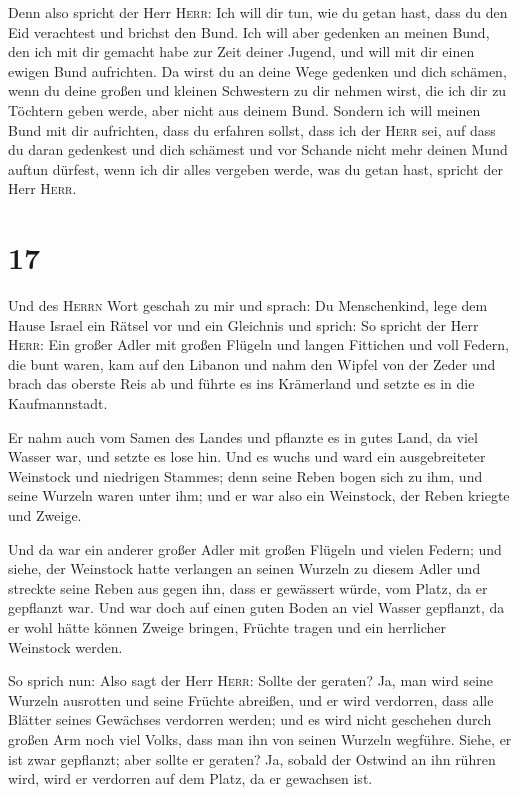  Denn also spricht der Herr \textsc{Herr}: Ich will dir
tun, wie du getan hast, dass du den Eid verachtest und brichst den Bund.
 Ich will aber gedenken an meinen Bund, den ich mit dir
gemacht habe zur Zeit deiner Jugend, und will mit dir einen ewigen Bund
aufrichten.  Da wirst du an deine Wege gedenken und dich
schämen, wenn du deine großen und kleinen Schwestern zu dir nehmen
wirst, die ich dir zu Töchtern geben werde, aber nicht aus deinem Bund.
 Sondern ich will meinen Bund mit dir aufrichten, dass du
erfahren sollst, dass ich der \textsc{Herr} sei,  auf
dass du daran gedenkest und dich schämest und vor Schande nicht mehr
deinen Mund auftun dürfest, wenn ich dir alles vergeben werde, was du
getan hast, spricht der Herr \textsc{Herr}.

\hypertarget{section-16}{%
\section{17}\label{section-16}}

 Und des \textsc{Herrn} Wort geschah zu mir und sprach:
 Du Menschenkind, lege dem Hause Israel ein Rätsel vor und
ein Gleichnis  und sprich: So spricht der Herr
\textsc{Herr}: Ein großer Adler mit großen Flügeln und langen Fittichen
und voll Federn, die bunt waren, kam auf den Libanon und nahm den Wipfel
von der Zeder  und brach das oberste Reis ab und führte es
ins Krämerland und setzte es in die Kaufmannstadt.

 Er nahm auch vom Samen des Landes und pflanzte es in
gutes Land, da viel Wasser war, und setzte es lose hin. 
Und es wuchs und ward ein ausgebreiteter Weinstock und niedrigen
Stammes; denn seine Reben bogen sich zu ihm, und seine Wurzeln waren
unter ihm; und er war also ein Weinstock, der Reben kriegte und Zweige.

 Und da war ein anderer großer Adler mit großen Flügeln
und vielen Federn; und siehe, der Weinstock hatte verlangen an seinen
Wurzeln zu diesem Adler und streckte seine Reben aus gegen ihn, dass er
gewässert würde, vom Platz, da er gepflanzt war.  Und war
doch auf einen guten Boden an viel Wasser gepflanzt, da er wohl hätte
können Zweige bringen, Früchte tragen und ein herrlicher Weinstock
werden.

 So sprich nun: Also sagt der Herr \textsc{Herr}: Sollte
der geraten? Ja, man wird seine Wurzeln ausrotten und seine Früchte
abreißen, und er wird verdorren, dass alle Blätter seines Gewächses
verdorren werden; und es wird nicht geschehen durch großen Arm noch viel
Volks, dass man ihn von seinen Wurzeln wegführe.  Siehe,
er ist zwar gepflanzt; aber sollte er geraten? Ja, sobald der Ostwind an
ihn rühren wird, wird er verdorren auf dem Platz, da er gewachsen ist.

